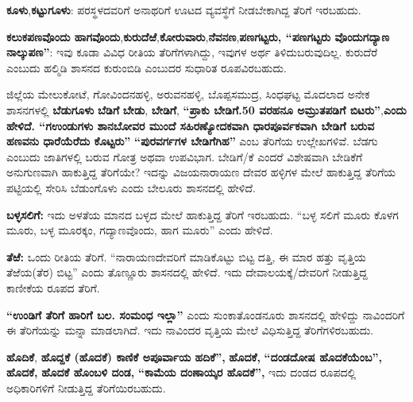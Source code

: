 \textbf{ಕೂಳು},\textbf{ಕಟ್ಟುಗೂಳು}: ಪರಸ್ಥಳದವರಿಗೆ ಅನಾಥರಿಗೆ ಊಟದ ವ್ಯವಸ್ಥೆಗೆ ನೀಡಬೇಕಾಗಿದ್ದ ತೆರಿಗೆ ಇರಬಹುದು.

\textbf{ಕಲುಕಪಣವೊಂದು ಹಾಗವೊಂದು},\textbf{ಕುರುದೆಱೆ},\textbf{ಕೋರುವಾರು},\textbf{ನೆವನಣ},\textbf{ಪಣಗಟ್ಟರು, “ಪಣಗಟ್ಟರು ವೊಂದುಗದ್ಯಾಣ ನಾಲ್ಕುಪಣ”}: ಇವು ಕೂಡಾ ವಿವಿಧ ರೀತಿಯ ತೆರಿಗೆಗಳಾಗಿದ್ದು, ಇವುಗಳ ಅರ್ಥ ತಿಳಿದುಬರುವುದಿಲ್ಲ. ಕುರುದೆರೆ ಎಂಬುದು ಹಲ್ಮಿಡಿ ಶಾಸನದ ಕುರುಂಬಿಡಿ ಎಂಬುದರ ಸುಧಾರಿತ ರೂಪವಿರಬಹುದು.

ಜಿಲ್ಲೆಯ ಮೇಲುಕೋಟೆ, ಗೋವಿಂದನಹಳ್ಳಿ, ಅರುವನಹಳ್ಳಿ, ಬೊಪ್ಪಸಮುದ್ರ, ಸಿಂಧಘಟ್ಟ ಮೊದಲಾದ ಅನೇಕ ಶಾಸನಗಳಲ್ಲಿ \textbf{ಬೆಡುಗೂಳು}\textbf{ ಬೆಡಿಗೆ}\textbf{ ಬೇಡು},\textbf{ ಬೇಡಿಗೆ},\textbf{ “ಪ್ರಾಕು ಬೇಡಿಗೆ.50 ವರಹನೂ ಅಮ್ರುತಪಡಿಗೆ ಬಿಟರು”},\break \textbf{ಎಂದು ಹೇಳಿದೆ. “ಗಉಂಡುಗಳು ಶಾನಬೋವರ ಮುಂದೆ ಸಹಿರಣ್ಯೋದಕವಾಗಿ ಧಾರಪೂರ್ವಕವಾಗಿ ಬೇಡಿಗೆ ಬರುವ ಹಣವನು ಧಾರೆಯೆರೆದು ಕೊಟ್ಟರು”}\textbf{ “ಪುರವರ್ಗಗಳ ಬೇಡಿಗೆಗಿಹ”} ಎಂಬ ತೆರಿಗೆಯ ಉಲ್ಲೇಖಗಳಿವೆ. ಬೆಡಗು ಎಂಬುದು ಜಾತಿಗಳಲ್ಲಿ ಬರುವ ಗೋತ್ರ ಅಥವಾ ಉಪವಿಭಾಗ. ಬೇಡಿಗೆ/ಕೆ ಎಂದರೆ ವಿಶೇಷವಾಗಿ ಬೇಡಿಕೆಗೆ ಅನುಗುಣವಾಗಿ ಹಾಕುತ್ತಿದ್ದ ತೆರಿಗೆಯೇ? ಇದನ್ನು ವಿಜಯನಾರಾಯಣ ದೇವರ ಹಳ್ಳಿಗಳ ಮೇಲೆ ಹಾಕುತ್ತಿದ್ದ ತೆರಿಗೆಯ ಪಟ್ಟಿಯಲ್ಲಿ ಸೇರಿಸಿ ಬೆಡುಂಗೊಳು ಎಂದು ಬೇಲೂರು ಶಾಸನದಲ್ಲಿ ಹೇಳಿದೆ.

\textbf{ಬಳ್ಳಸಲಿಗೆ:} ಇದು ಅಳತೆಯ ಮಾನದ ಬಳ್ಳದ ಮೇಲೆ ಹಾಕುತ್ತಿದ್ದ ತೆರಿಗೆ ಇರಬಹುದು. “ಬಳ್ಳ ಸಲಿಗೆ ಮೂರು ಕೊಳಗ ಮೂರು, ಬಳ್ಳ ಮೂರಕ್ಕಂ, ಗದ್ಯಾಣವೊಂದು, ಹಾಗ ಮೂರು” ಎಂದು ಹೇಳಿದೆ.

\textbf{ತೆಱೆ: } ಒಂದು ರೀತಿಯ ತೆರಿಗೆ. “ನಾರಾಯಣದೇವರಿಗೆ ಮಾಡಿಕೊಟ್ಟು ಬಿಟ್ಟ ದತ್ತಿ, ಈ ಮಾರ ಹತ್ತು ವೃತ್ತಿಯ ತೆಱೆಯ(ತೆರ) ಬಿಟ್ಟ” ಎಂದು ತೊಣ್ಣೂರು ಶಾಸನದಲ್ಲಿ ಹೇಳಿದೆ. ಇದು ದೇವಾಲಯಕ್ಕೆ/ದೇವರಿಗೆ ನೀಡುತ್ತಿದ್ದ ಕಾಣೀಕೆಯ ರೂಪದ ತೆರಿಗೆ.

\textbf{“ಉಂಡಿಗೆ ತೆರಿಗೆ ಹಾರಿಗೆ ಬಲ. ಸಂಮಂಧ ಇಲ್ಲಾ”} ಎಂದು ಸುಂಕಾತೊಂಡನೂರು ಶಾಸನದಲ್ಲಿ ಹೇಳಿದ್ದು ನಾವಿಂದರಿಗೆ ಈ ತೆರಿಗೆಯನ್ನು ಮನ್ನಾ ಮಾಡಲಾಗಿದೆ. ಇದು ನಾವಿಂದರ ವೃತ್ತಿಯ ಮೇಲೆ ವಿಧಿಸುತ್ತಿದ್ದ ತೆರಿಗೆಗಳಿರಬಹುದು.

\textbf{ಹೊದಿಕೆ},\textbf{ ಹೊದ್ದಕೆ (ಹೊದಕೆ) ಕಾಣಿಕೆ ಅಪೂರ್ವಾಯ ಹದಿಕೆ”,}\textbf{ ಹೊದಕೆ,}\textbf{ “ದಂಡದೋಷ\general{\break } ಹೊದಕೆಯೆಂಬ”,}\textbf{ ಹೊದಕೆ,}\textbf{ ಹೊದಕೆ ಹೊಂಬಳಿ ದಂಡ,}\textbf{ “ಕಾಮೆಯ ದಂಣಾಯ್ಕರ ಹೊದಕೆ”,} ಇದು ದಂಡದ ರೂಪದಲ್ಲಿ ಅಧಿಕಾರಿಗಳಿಗೆ ನೀಡುತ್ತಿದ್ದ ತೆರಿಗೆಯಿರಬಹುದು.


